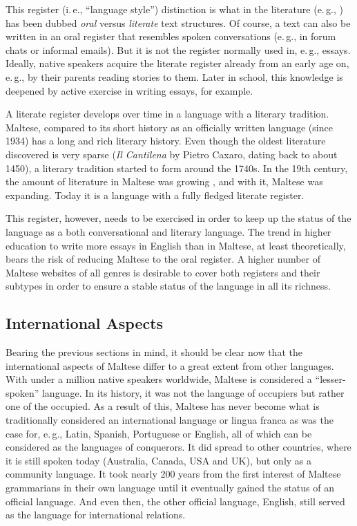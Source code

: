 \documentclass[]{../../metanetpaper}
\begin{document}
\begin{multicols}{2}
This register (i.\,e., ``language style'') distinction is what in the literature (e.\,g., \cite{Biber:1991}) has been dubbed \emph{oral} versus \emph{literate} text structures. Of course, a text can also be written in an oral register that resembles spoken conversations (e.\,g., in forum chats or informal emails). But it is not the register normally used in, e.\,g., essays. Ideally, native speakers acquire the literate register already from an early age on, e.\,g., by their parents reading stories to them. Later in school, this knowledge is deepened by active exercise in writing essays, for example.

A literate register develops over time in a language with a literary tradition. Maltese, compared to its short history as an officially written language (since 1934) has a long and rich literary history. Even though the oldest literature discovered is very sparse (\emph{Il Cantilena} by Pietro Caxaro, dating back to about 1450), a literary tradition started to form around the 1740s. In the 19th century, the amount of literature in Maltese was growing \cite{Fabri:2011a}, and with it, Maltese was expanding. Today it is a language with a fully fledged literate register. 

This register, however, needs to be exercised in order to keep up the status of the language as a both conversational and literary language. The trend in higher education to write more essays in English than in Maltese, at least theoretically, bears the risk of reducing Maltese to the oral register. A higher number of Maltese websites of all genres is desirable to cover both registers and their subtypes in order to ensure a stable status of the language in all its richness.


\subsection{International Aspects}

Bearing the previous sections in mind, it should be clear now that the international aspects of Maltese differ to a great extent from other languages. With under a million native speakers worldwide, Maltese is considered a ``lesser-spoken'' language. In its history, it was not the language of occupiers but rather one of the occupied. As a result of this, Maltese has never become what is traditionally considered an international language or lingua franca as was the case for, e.\,g., Latin, Spanish, Portuguese or English, all of which can be considered as the languages of conquerors. It did spread to other countries, where it is still spoken today (Australia, Canada, USA and UK), but only as a community language. It took nearly 200 years from the first interest of Maltese grammarians in their own language until it eventually gained the status of an official language. And even then, the other official language, English, still served as the language for international relations. 


\end{multicols}
\end{document}
